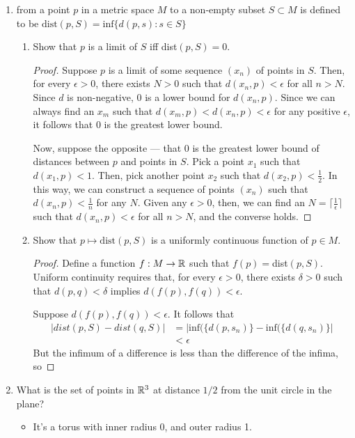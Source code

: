 \documentclass[11pt, a4paper, latinreim, shortsets]{notes}
\begin{document}
\begin{enumerate}[label={\bfseries 2.\arabic*}]
	\item from a point $p$ in a metric space $M$ to a non-empty subset
	$S \subset M$ is defined to be $\text{dist}(p,S) = \text{inf}\{d(p,s) : s \in S\}$

	\begin{enumerate}[label=\alph*)]
		\item Show that $p$ is a limit of $S$ iff dist$(p,S)=0$.
			\begin{proof}
				Suppose $p$ is a limit of some sequence $(x_n)$ of points in $S$. Then, for every
				$\epsilon > 0$, there exists $N > 0$ such that $d(x_n, p) < \epsilon$ for all $n > N$.
				Since $d$ is non-negative, 0 is a lower bound for $d(x_n, p)$. Since we can always
				find an $x_m$ such that $d(x_m, p) < d(x_n, p) < \epsilon$ for any positive $\epsilon$,
				it follows that 0 is the greatest lower bound.

				Now, suppose the opposite --- that 0 is the greatest lower bound of distances between
				$p$ and points in $S$. Pick a point $x_1$ such that $d(x_1, p) < 1$. Then, pick another
				point $x_2$ such that $d(x_2, p) < \frac{1}{2}$. In this way, we can construct a
				sequence of points $(x_n)$ such that $d(x_n, p) < \frac{1}{n}$ for any $N$. Given
				any $\epsilon > 0$, then, we can find an $N = \lceil\frac{1}{\epsilon}\rceil$ such that
				$d(x_n, p) < \epsilon$ for all $n > N$, and the converse holds.
			\end{proof}
		\item Show that $p\mapsto \text{dist}(p,S)$ is a uniformly continuous function of $p \in M$.
			\begin{proof}
				Define a function $f : M \rightarrow \mathbb{R}$ such that $f(p) = $dist$(p,S)$. Uniform
				continuity requires that, for every $\epsilon > 0$, there exists $\delta > 0$ such
				that $d(p,q) < \delta$ implies $d(f(p),f(q)) < \epsilon$. 

				Suppose $d(f(p),f(q)) < \epsilon$. It follows that
				\begin{align}
					|dist(p,S) - dist(q,S)| &= |\text{inf}(\{d(p, s_n)\} - \text{inf}(\{d(q, s_n)\}| \\
											&< \epsilon 
				\end{align}
				But the infimum of a difference is less than the difference of the infima, so
			\end{proof}
	\end{enumerate}

	\item What is the set of points in $\mathbb{R}^3$ at distance $1/2$ from the unit circle in the plane?
	\begin{itemize}
		\item[] It's a torus with inner radius 0, and outer radius 1.
	\end{itemize}


\end{enumerate}
\end{document}
